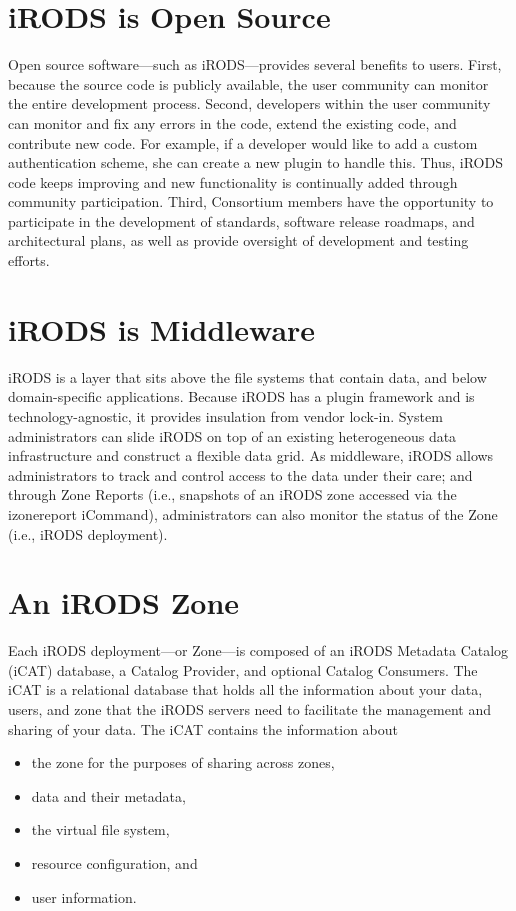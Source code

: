 \documentclass[10pt,oneside]{memoir}
\begin{document}
\section{iRODS is Open Source}

Open source software---such as iRODS---provides several benefits to users. First, because the source code is publicly available, the user community can monitor the entire development process. Second, developers within the user community can monitor and fix any errors in the code, extend the existing code, and contribute new code. For example, if a developer would like to add a custom authentication scheme, she can create a new plugin to handle this. Thus, iRODS code keeps improving and new functionality is continually added through community participation. Third, Consortium members have the opportunity to participate in the development of standards, software release roadmaps, and architectural plans, as well as provide oversight of development and testing efforts.

\section{iRODS is Middleware}

iRODS is a layer that sits above the file systems that contain data, and below domain-specific applications. Because iRODS has a plugin framework and is technology-agnostic, it provides insulation from vendor lock-in. System administrators can slide iRODS on top of an existing heterogeneous data infrastructure and construct a flexible data grid. As middleware, iRODS allows administrators to track and control access to the data under their care; and through Zone Reports (i.e., snapshots of an iRODS zone accessed via the izonereport iCommand), administrators can also monitor the status of the Zone (i.e., iRODS deployment).


\section{An iRODS Zone}

Each iRODS deployment---or Zone---is composed of an iRODS Metadata Catalog (iCAT) database, a Catalog Provider, and optional Catalog Consumers. The iCAT is a relational database that holds all the information about your data, users, and zone that the iRODS servers need to facilitate the management and sharing of your data. The iCAT contains the information about
 \begin{itemize}
 \item the zone for the purposes of sharing across zones,
 \item data and their metadata,
 \item the virtual file system,
 \item resource configuration, and
 \item user information.
 \end{itemize}
\end{document}
